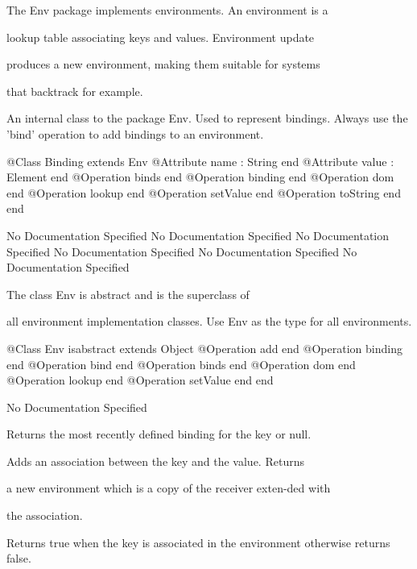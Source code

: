     The Env package implements environments. An environment is a

    lookup table associating keys and values. Environment update

    produces a new environment, making them suitable for systems

    that backtrack for example.

      An internal class to the package Env. Used to represent bindings.
      Always use the 'bind' operation to add bindings to an environment.
\begin{Interface}
@Class Binding extends Env
  @Attribute name : String end
  @Attribute value : Element end
  @Operation binds end
  @Operation binding end
  @Operation dom end
  @Operation lookup end
  @Operation setValue end
  @Operation toString end
end
\end{Interface}
No Documentation Specified
No Documentation Specified
No Documentation Specified
No Documentation Specified
No Documentation Specified
No Documentation Specified

      The class Env is abstract and is the superclass of

      all environment implementation classes. Use Env as the 
      type for all environments.
\begin{Interface}
@Class Env isabstract extends Object
  @Operation add end
  @Operation binding end
  @Operation bind end
  @Operation binds end
  @Operation dom end
  @Operation lookup end
  @Operation setValue end
end
\end{Interface}
No Documentation Specified

        Returns the most recently defined binding for the key or null.

         Adds an association between the key and the value. Returns

         a new environment which is a copy of the receiver exten-ded with

         the association.

        Returns true when the key is associated in the 
        environment otherwise returns false.

